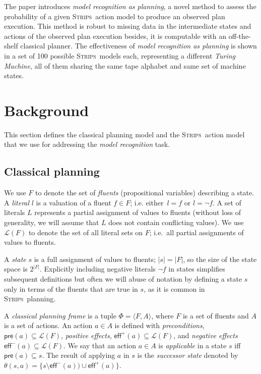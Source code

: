 \documentclass[letterpaper]{article} %
\newcommand{\tup}[1]{{\langle #1 \rangle}}
\newcommand{\pre}{\mathsf{pre}}     %
\newcommand{\eff}{\mathsf{eff}}     %
\newcommand{\strips}{\textsc{Strips}}     %
\begin{document}
The paper introduces {\em model recognition as planning}, a novel method to assess the probability of a given \strips\ action model to produce an observed plan execution. This method is robust to missing data in the intermediate states and actions of the observed plan execution besides, it is computable with an off-the-shelf classical planner. The effectiveness of {\em model recognition as planning} is shown in a set of 100 possible \strips\ models each, representing a different {\em Turing Machine}, all of them sharing the same tape alphabet and same set of machine states.


\section{Background}
\label{sec:section2}
This section defines the classical planning model and the \strips\ action model that we use for addressing the {\em model recognition} task.

\subsection{Classical planning}
We use $F$ to denote the set of {\em fluents} (propositional variables) describing a state. A {\em literal} $l$ is a valuation of a fluent $f\in F$; i.e. either~$l=f$ or $l=\neg f$. A set of literals $L$ represents a partial assignment of values to fluents (without loss of generality, we will assume that $L$ does not contain conflicting values). We use $\mathcal{L}(F)$ to denote the set of all literal sets on $F$; i.e.~all partial assignments of values to fluents.

A {\em state} $s$ is a full assignment of values to fluents; $|s|=|F|$, so the size of the state space is $2^{|F|}$. Explicitly including negative literals $\neg f$ in states simplifies subsequent definitions but often we will abuse of notation by defining a state $s$ only in terms of the fluents that are true in $s$, as it is common in \strips\ planning.

A {\em classical planning frame} is a tuple $\Phi=\tup{F,A}$, where $F$ is a set of fluents and $A$ is a set of actions. An action $a\in A$ is defined with {\em preconditions}, $\pre(a)\subseteq\mathcal{L}(F)$, {\em positive effects}, $\eff^+(a)\subseteq\mathcal{L}(F)$, and {\em negative effects} $\eff^-(a)\subseteq\mathcal{L}(F)$. We say that an action $a\in A$ is {\em applicable} in a state $s$ iff $\pre(a)\subseteq s$. The result of applying $a$ in $s$ is the {\em successor state} denoted by $\theta(s,a)=\{s\setminus\eff^-(a))\cup\eff^+(a)\}$.
\end{document}
